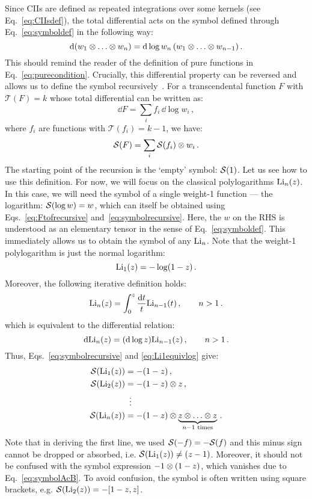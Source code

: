\documentclass[main.tex]{subfiles}
\begin{document}
Since CIIs are defined as repeated integrations over some kernels (see Eq.~\ref{eq:CIIsdef}), the total differential acts on the symbol defined through Eq.~\ref{eq:symboldef} in the following way:
\begin{equation} \label{eq:symboldiff}
    \mathrm{d} (w_1 \otimes \ldots \otimes w_n) = \mathrm{d} \log w_n \, (w_1 \otimes \ldots \otimes w_{n-1})\,.
\end{equation}
This should remind the reader of the definition of pure functions in Eq.~\ref{eq:purecondition}. Crucially, this differential property can be reversed and allows us to define the symbol recursively~\cite{Goncharov:2010jf}. For a transcendental function $F$ with $\mathcal{T}(F) = k$ whose total differential can be written as:
\begin{equation} \label{eq:Ftofrecursive}
    \dd F = \sum_i f_i \, \dd \log w_i\,,
\end{equation}
where $f_i$ are functions with $\mathcal{T}(f_i)=k-1$, we have:
\begin{equation} \label{eq:symbolrecursive}
    \mathcal{S}(F) = \sum_i \mathcal{S}(f_i)\otimes w_i \,.
\end{equation}
The starting point of the recursion is the `empty' symbol: $\mathcal{S}(1)$. Let us see how to use this definition. For now, we will focus on the classical polylogarithms $\text{Li}_n(z)$. In this case, we will need the symbol of a single weight-1 function --- the logarithm: $\mathcal{S}(\log w) = w$, which can itself be obtained using Eqs.~\ref{eq:Ftofrecursive} and~\ref{eq:symbolrecursive}. Here, the $w$ on the RHS is understood as an elementary tensor in the sense of Eq.~\ref{eq:symboldef}. This immediately allows us to obtain the symbol of any $\text{Li}_n$. Note that the weight-1 polylogarithm is just the normal logarithm:
\begin{equation} \label{eq:Li1equivlog}
    \text{Li}_1(z) = -\log (1-z)\,. 
\end{equation}
Moreover, the following iterative definition holds:
\begin{equation} \label{eq:Liiterative}
    \text{Li}_n(z) = \int_0^z \frac{\mathrm{d} t}{t} \text{Li}_{n-1}(t)\,, \qquad n>1\,.
\end{equation}
which is equivalent to the differential relation:
\begin{equation}
    \mathrm{d} \text{Li}_n(z) = (\mathrm{d} \log z) \text{Li}_{n-1}(z)\,, \qquad n>1\,.
\end{equation}
Thus, Eqs.~\ref{eq:symbolrecursive} and \ref{eq:Li1equivlog} give:
\begin{align} \label{eq:Lisymbols}
    \mathcal{S}(\text{Li}_1(z)) &= -(1-z)\,, \nonumber \\
    \mathcal{S}(\text{Li}_2(z)) &= -(1-z) \otimes z \,, \nonumber \\
    &\,\,\, \vdots \nonumber \\
    \mathcal{S}(\text{Li}_n(z)) &= -(1-z) \otimes \underbrace{z \otimes \ldots \otimes z}_{n-1 \text{ times}}\,.
\end{align}
Note that in deriving the first line, we used $\mathcal{S}(-f) = -\mathcal{S}(f)$ and this minus sign cannot be dropped or absorbed, i.e. $\mathcal{S}(\text{Li}_1(z)) \neq (z-1)$. Moreover, it should not be confused with the symbol expression $-1 \otimes (1-z)$, which vanishes due to Eq.~\ref{eq:symbolAcB}. To avoid confusion, the symbol is often written using square brackets, e.g. $\mathcal{S}(\text{Li}_2(z)) = -[1-z, z]$.
\end{document}

